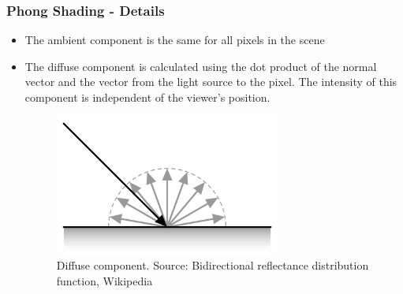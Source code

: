 \documentclass{beamer}
\begin{document}
  \begin{frame}
    \frametitle{Phong Shading - Details}
    \begin{itemize}
      \item The ambient component is the same for all pixels in the scene
      \item The diffuse component is calculated using the dot product of the normal vector and the vector from the light source to the pixel.
      The intensity of this component is independent of the viewer's position.

      \begin{figure}
        \centering
        \includegraphics[width=0.7\textwidth]{diffuse.png}
        \caption{Diffuse component. Source: Bidirectional reflectance distribution function, Wikipedia}\label{fig:diffuse}
      \end{figure}
    \end{itemize}

  \end{frame}
\end{document}
